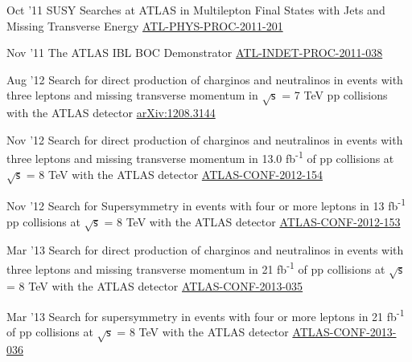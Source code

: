 \documentclass[]{cv} %
\begin{document}
\begin{entrylist}

  \entry
  {Oct '11}
  {{\normalfont SUSY Searches at ATLAS in Multilepton Final States with Jets and Missing Transverse Energy}}
  {\href{https://cds.cern.ch/record/1394331}{ATL-PHYS-PROC-2011-201}}
  {\vspace*{-9pt}}

  \entry
  {Nov '11}
  {{\normalfont The ATLAS IBL BOC Demonstrator}}
  {\href{https://cds.cern.ch/record/1401224}{ATL-INDET-PROC-2011-038}}
  {\vspace*{-9pt}}

  \entry
  {Aug '12}
  {{\normalfont Search for direct production of charginos and neutralinos in events with three leptons and missing transverse momentum in $\sqrt{\mathsf{s}}$ =
  7 TeV pp collisions with the ATLAS detector}}
  {\href{http://arxiv.org/abs/1208.3144}{arXiv:1208.3144}}
  {\vspace*{-9pt}}

  \entry
  {Nov '12}
  {{\normalfont Search for direct production of charginos and neutralinos in events with three leptons and missing transverse momentum in 13.0
  fb\textsuperscript{-1} of pp collisions at $\sqrt{\mathsf{s}}$ = 8 TeV with the ATLAS detector}}
  {\href{https://cds.cern.ch/record/1493493}{ATLAS-CONF-2012-154}}
  {\vspace*{-9pt}}

  \entry
  {Nov '12}
  {{\normalfont Search for Supersymmetry in events with four or more leptons in 13 fb\textsuperscript{-1} pp collisions at $\sqrt{\mathsf{s}}$
  = 8 TeV with the ATLAS detector}}
  {\href{https://cds.cern.ch/record/1493492}{ATLAS-CONF-2012-153}}
  {\vspace*{-9pt}}

  \entry
  {Mar '13}
  {{\normalfont Search for direct production of charginos and neutralinos in events with three leptons and missing transverse momentum in 21
    fb\textsuperscript{-1} of pp
  collisions at $\sqrt{\mathsf{s}}$ = 8 TeV with the ATLAS detector}}
  {\href{https://cds.cern.ch/record/1532426}{ATLAS-CONF-2013-035}}
  {\vspace*{-9pt}}

  \entry
  {Mar '13}
  {{\normalfont Search for supersymmetry in events with four or more leptons in 21 fb\textsuperscript{-1} of pp collisions at
  $\sqrt{\mathsf{s}}$ = 8 TeV with the ATLAS detector}}
{\href{https://cds.cern.ch/record/1532429}{ATLAS-CONF-2013-036}}
{\vspace*{-9pt}}


\end{entrylist}
\end{document}
